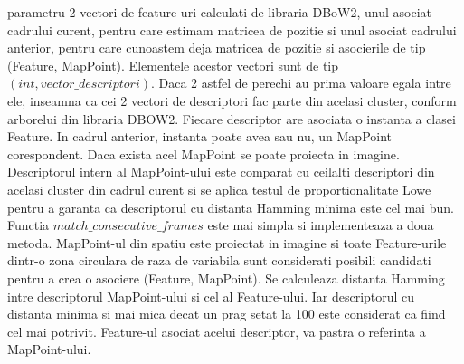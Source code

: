 \documentclass[12pt,a4paper]{report}
\begin{document}
parametru 2 vectori de feature-uri calculati de libraria DBoW2, unul asociat cadrului curent, pentru     
care estimam matricea de pozitie si unul asociat cadrului anterior, pentru care cunoastem deja matricea de pozitie
si asocierile de tip (Feature, MapPoint). Elementele acestor vectori sunt de tip $ (int, vector\_descriptori) $.
Daca 2 astfel de perechi au prima valoare egala intre ele, inseamna ca cei 2 vectori de descriptori fac parte din 
acelasi cluster, conform arborelui din libraria DBOW2. Fiecare descriptor are asociata o instanta a clasei 
Feature. In cadrul anterior, instanta poate avea sau nu, un MapPoint corespondent. Daca exista acel
MapPoint se poate proiecta in imagine. Descriptorul intern al MapPoint-ului este comparat cu ceilalti 
descriptori din acelasi cluster din cadrul curent si se aplica testul de proportionalitate Lowe pentru a
garanta ca descriptorul cu distanta Hamming minima este cel mai bun.   
Functia $ match\_consecutive\_frames $ este mai simpla si implementeaza a doua metoda. MapPoint-ul din 
spatiu este proiectat in imagine si toate Feature-urile dintr-o zona circulara de raza de variabila
sunt considerati posibili candidati pentru a crea o asociere (Feature, MapPoint). Se calculeaza distanta 
Hamming intre descriptorul MapPoint-ului si cel al Feature-ului. Iar descriptorul cu distanta minima si 
mai mica decat un prag setat la 100 este considerat ca fiind cel mai potrivit. Feature-ul asociat acelui
descriptor, va pastra o referinta a MapPoint-ului. \\
\end{document}
